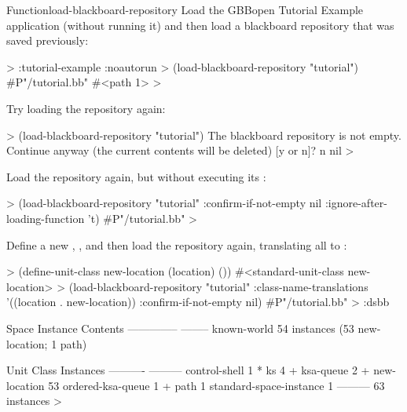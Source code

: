 \documentclass[10pt,twoside,english,pdftex]{article}
\begin{document}
\begin{functiondoc}{Function}{load-blackboard-repository}
\fnexamples Load the GBBopen Tutorial Example application (without running it)
and then load a blackboard repository that was saved previously:
%
\W\supp
\begin{example}
  > :tutorial-example :noautorun 
  > (load-blackboard-repository "tutorial")
  #P"/tutorial.bb"
  #<path 1>
  >
\end{example}
%
Try loading the repository again:
%
\W\supp\notpretop
\begin{example}
  > (load-blackboard-repository "tutorial")
  The blackboard repository is not empty.
  Continue anyway (the current contents will be deleted) [y or n]? n
  nil
  >
\end{example}
%
Load the repository again, but without executing its
:
%
\W\supp\notpretop
\begin{example}
  > (load-blackboard-repository "tutorial" 
      :confirm-if-not-empty nil
      :ignore-after-loading-function 't)
  #P"/tutorial.bb"
  >
\end{example}
%
Define a new , , and then load the
repository again, translating all   to
 :
%
\W\supp\notpretop
\begin{example}
  > (define-unit-class new-location (location) ())
  #<standard-unit-class new-location>
  > (load-blackboard-repository "tutorial"
      :class-name-translations '((location . new-location))
      :confirm-if-not-empty nil)
  #P"/tutorial.bb"
  > :dsbb

  Space Instance                Contents
  --------------                --------
  known-world                   54 instances (53 new-location; 1 path)

  Unit Class                    Instances
  ----------                    ---------
  control-shell                         1 *
  ks                                    4 +
  ksa-queue                             2 +
  new-location                         53  
  ordered-ksa-queue                     1 +
  path                                  1  
  standard-space-instance               1  
                                ---------
                                       63 instances
  >
\end{example}

\end{functiondoc}

\end{document}
